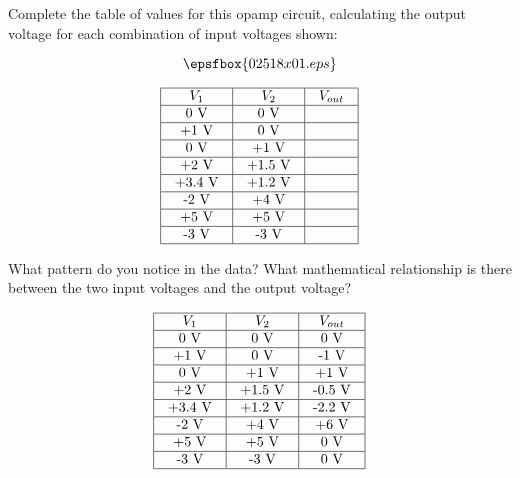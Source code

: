 

Complete the table of values for this opamp circuit, calculating the output voltage for each combination of input voltages shown:

$$\epsfbox{02518x01.eps}$$


$$\vbox{\offinterlineskip
\halign{\strut
\vrule \quad\hfil # \ \hfil & 
\vrule \quad\hfil # \ \hfil & 
\vrule \quad\hfil # \ \hfil \vrule \cr
\noalign{\hrule}
%
$V_1$ & $V_2$ & $V_{out}$ \cr
%
\noalign{\hrule}
%
0 V & 0 V &  \cr
%
\noalign{\hrule}
%
+1 V & 0 V &  \cr
%
\noalign{\hrule}
%
0 V & +1 V &  \cr
%
\noalign{\hrule}
%
+2 V & +1.5 V &  \cr
%
\noalign{\hrule}
%
+3.4 V & +1.2 V &  \cr
%
\noalign{\hrule}
%
-2 V & +4 V &  \cr
%
\noalign{\hrule}
%
+5 V & +5 V &  \cr
%
\noalign{\hrule}
%
-3 V & -3 V &  \cr
%
\noalign{\hrule}
} %
}$$ %

What pattern do you notice in the data?  What mathematical relationship is there between the two input voltages and the output voltage?








$$\vbox{\offinterlineskip
\halign{\strut
\vrule \quad\hfil # \ \hfil & 
\vrule \quad\hfil # \ \hfil & 
\vrule \quad\hfil # \ \hfil \vrule \cr
\noalign{\hrule}
%
$V_1$ & $V_2$ & $V_{out}$ \cr
%
\noalign{\hrule}
%
0 V & 0 V & 0 V \cr
%
\noalign{\hrule}
%
+1 V & 0 V & -1 V \cr
%
\noalign{\hrule}
%
0 V & +1 V & +1 V \cr
%
\noalign{\hrule}
%
+2 V & +1.5 V & -0.5 V \cr
%
\noalign{\hrule}
%
+3.4 V & +1.2 V & -2.2 V \cr
%
\noalign{\hrule}
%
-2 V & +4 V & +6 V \cr
%
\noalign{\hrule}
%
+5 V & +5 V & 0 V \cr
%
\noalign{\hrule}
%
-3 V & -3 V & 0 V \cr
%
\noalign{\hrule}
} %
}$$ %

